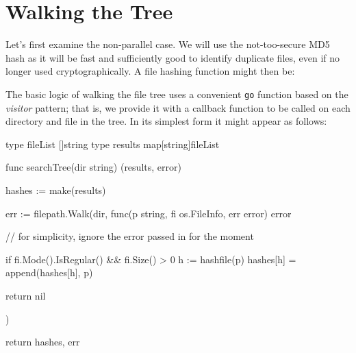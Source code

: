 \documentclass[12pt,notitlepage]{article}
\begin{document}
\section{Walking the Tree}
Let's first examine the non-parallel case. We will use the not-too-secure
MD5 hash as it will be fast and sufficiently good to identify duplicate files,
even if no longer used cryptographically. A file hashing function might then
be:

The basic logic of walking the file tree uses a convenient \verb|go| function
based on the {\em visitor} pattern; that is, we provide it with a callback
function to be called on each directory and file in the tree. In its simplest
form it might appear as follows:
\begin{golang}
type fileList []string
type results map[string]fileList

func searchTree(dir string) (results, error) {
	hashes := make(results)

	err := filepath.Walk(dir, func(p string, fi os.FileInfo, err error) error {
        // for simplicity, ignore the error passed in for the moment

		if fi.Mode().IsRegular() && fi.Size() > 0 {
			h := hashfile(p)
			hashes[h] = append(hashes[h], p)
		}

		return nil
	})

	return hashes, err
}
\end{golang}
\end{document}
